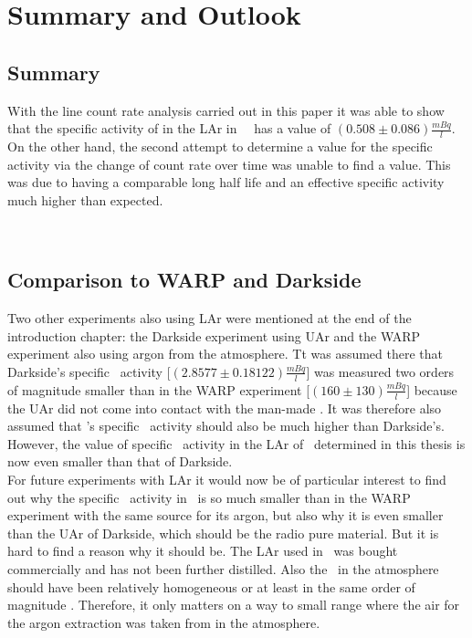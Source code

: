 \documentclass[encoding=utf8,british]{tumphthesis}
\begin{document}


\chapter{Summary and Outlook}
\label{sec:ConcAndOutlook}
\section{Summary}
With the line count rate analysis carried out in this paper it was able to show that the specific activity of  in the LAr in \gerda\ \PII\ has a value of $(0.508\pm0.086) \frac{\unit{mBq}}{\unit{l}}$. 
On the other hand, the second attempt to determine a value for the specific activity via the change of count rate over time was unable to find a value.
This was due to  having a comparable long half life and an effective specific activity much higher than expected.

\\
\section{Comparison to WARP and Darkside}

Two other experiments also using LAr were mentioned at the end of the introduction chapter: the Darkside experiment using UAr and the WARP experiment also using argon from the atmosphere.
Tt was assumed there that Darkside's specific \Kr\ activity [$(2.8577 \pm 0.18122) \frac{\unit{mBq}}{\unit{l}}$] was measured two orders of magnitude smaller than in the WARP experiment [$(160\pm130)\frac{\unit{mBq}}{\unit{l}}$] because the UAr did not come into contact with the man-made \Kr.
It was therefore also assumed that \gerda's specific \Kr\ activity should also be much higher than Darkside's.
However, the value of specific \Kr\ activity in the LAr of \gerda\ determined in this thesis is now even smaller than that of Darkside.
\\

For future experiments with LAr it would now be of particular interest to find out why the specific \Kr\ activity in \gerda\ is so much smaller than in the WARP experiment with the same source for its argon, but also why it is even smaller than the UAr of Darkside, which should be the radio pure material.
But it is hard to find a reason why it should be.
The LAr used in \gerda\ was bought commercially and has not been further distilled.
Also the \Kr\ in the atmosphere should have been relatively homogeneous or at least in the same order of magnitude \cite{j._jacob_atmospheric_1987}.
Therefore, it only matters on a way to small range where the air for the argon extraction was taken from in the atmosphere.
\\
\end{document}
